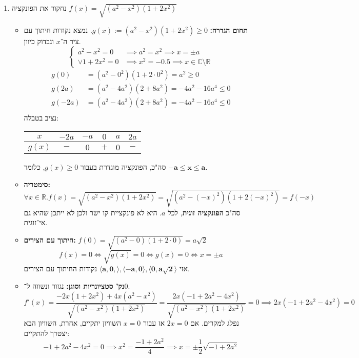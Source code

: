 \documentclass[]{article}
\newcommand\R     {\mathbb{R}}
\newcommand\C     {\mathbb{C}}
\newcommand\ra    {\rangle}
\newcommand\la    {\langle}
\begin{document}
\begin{enumerate}
		\item נחקור את הפונקציה $f(x) = \sqrt{(a^2 - x^2)(1 + 2x^2)}$
		\begin{itemize}
			\item \textbf{תחום הגדרה: }$g(x) := (a^{2} - x^2)(1 + 2x^2) \ge 0 $. נמצא נקודות חיתוך עם ציר ה־$x$ ונבדוק כיוון. 
			\[ \begin{cases}
				a^2 - x^2 = 0  & \implies a^2 = x^2 \implies x = \pm a\\
				\lor 1 + 2x^2 = 0 &\implies x^2 = -0.5 \implies x \in \C \setminus \R
			\end{cases} \]
			\begin{align*}
				g(0) &= (a^2 - 0^2)(1 + 2\cdot 0^2) = a^2 \ge 0\\
				g(2a) &= (a^2 - 4a^2)(2 + 8a^2) = -4a^2 - 16a^4 \le 0 \\
				g(-2a) &= (a^2 - 4a^2)(2 + 8a^2) = -4a^2 - 16a^4 \le 0 \\
			\end{align*}
			נציב בטבלה: 
			\begin{center}
				\begin{tabular}{|c|c|c|c|c|c|}
					\hline $x$ & $-2a$ & $-a$ & $0$ & $a$ & $2a$ \\
					\hline $g(x)$ & $-$ & $0$ & $+$ & $0$ & $-$ \\
					\hline
				\end{tabular}
			\end{center}
			סה"כ, הפונקציה מוגדרת בעבור $g(x) \ge 0$, כלומר $\bm{-a \le x \le a}$. 
			\item \textbf{סימטריה: }
			\[ \forall x \in \R. f(x) = \sqrt{(a^2 - x^2)(1 + 2x^2)} = \sqrt{(a^2 - (-x)^2)(1 + 2(-x)^2)} = f(-x) \]
			סה"כ \textbf{הפונקציה זוגית}, לכל $a$. היא לא פונקציית קו ישר ולכן לא ייתכן שהיא גם אי־זוגית. 
			\item \textbf{חיתוך עם הצירים: }$f(0) = \sqrt{(a^2 - 0)(1 + 2 \cdot 0)} = a\sqrt{2}$
			\[ f(x) = 0 \iff \sqrt{g(x)} = 0 \iff g(x) = 0 \iff x = \pm a \]
			אזי $\bm{\la a, 0, \ra, \la -a, 0 \ra, \la 0, a \sqrt 2 \ra}$ נקודות החיתוך עם הצירים. 
			\item \textbf{נק' סטציונריות וסוגן: }נגזור ונשווה ל־$0$. 
			\[ f'(x) = \frac{-2x(1 + 2x^2) + 4x(a^2 - x^2)}{\sqrt{(a^2 - x^2)(1 + 2x^2)}} = \frac{2x(- 1 + 2a^2 - 4x^2 )}{\sqrt{(a^2 - x^2)(1 + 2x^2)}} = 0 \implies 2x(- 1 + 2a^2 - 4x^2) = 0 \]
				נפלג למקרים. אם $2x = 0 $ אז עבור $x =0$ השוויון יתקיים, אחרת, השוויון הבא יצטרך להתקיים: 
				\[ - 1 + 2a^2 - 4x^2 = 0 \implies x^2 = \frac{-1 + 2a^2}{4} \implies x = \pm \frac{1}{2}\sqrt{-1 + 2a^2} \]

\end{itemize}
\end{enumerate}
\end{document}
